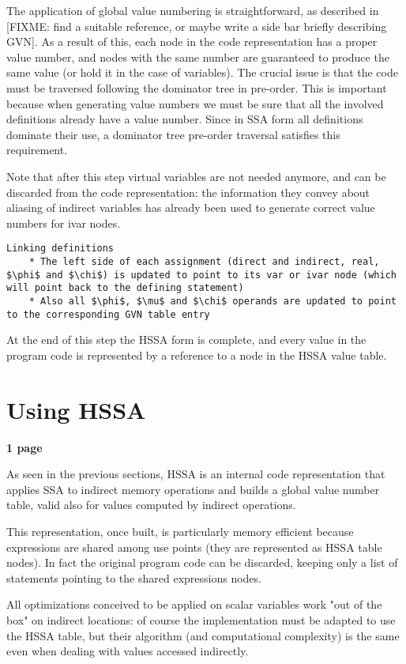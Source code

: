 The application of global value numbering is straightforward, as described in [FIXME: find a suitable reference, or maybe write a side bar briefly describing GVN].
As a result of this, each node in the code representation has a proper value number, and nodes with the same number are guaranteed to produce the same value (or hold it in the case of variables).
The crucial issue is that the code must be traversed following the dominator tree in pre-order. This is important because when generating value numbers we must be sure that all the involved definitions already have a value number. Since in SSA form all definitions dominate their use, a dominator tree pre-order traversal satisfies this requirement.

Note that after this step virtual variables are not needed anymore, and can be discarded from the code representation: the information they convey about aliasing of indirect variables has already been used to generate correct value numbers for ivar nodes.

\begin{verbatim}
Linking definitions
    * The left side of each assignment (direct and indirect, real, $\phi$ and $\chi$) is updated to point to its var or ivar node (which will point back to the defining statement)
    * Also all $\phi$, $\mu$ and $\chi$ operands are updated to point to the corresponding GVN table entry
\end{verbatim}

At the end of this step the HSSA form is complete, and every value in the program code is represented by a reference to a node in the HSSA value table.

\section{Using HSSA}
\textbf{1 page}

As seen in the previous sections, HSSA is an internal code representation that applies SSA to indirect memory operations and builds a global value number table, valid also for values computed by indirect operations.


This representation, once built, is particularly memory efficient because expressions are shared among use points (they are represented as HSSA table nodes). In fact the original program code can be discarded, keeping only a list of statements pointing to the shared expressions nodes.

All optimizations conceived to be applied on scalar variables work "out of the box" on indirect locations: of course the implementation must be adapted to use the HSSA table, but their algorithm (and computational complexity) is the same even when dealing with values accessed indirectly.

